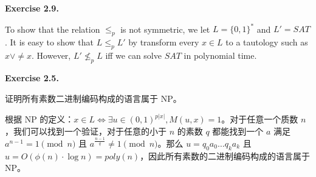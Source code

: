 \documentclass[a4paper]{article}
\newenvironment{exercise}[1]{
	\par
	\noindent\textbf{Exercise #1.}\quad
}{
	\par
	\bigskip
}
\begin{document}
	\begin{exercise}{2.9}
		To show that the relation $\leq_p$ is not symmetric, we let $L=\{0,1\}^*$ and $L'=SAT$. It is easy to show that $L\leq_p L'$ by transform every $x\in L$ to a tautology such as $x\vee \neq x$. However, $L'\not\leq_p L$ iff we can solve $SAT$ in polynomial time.
	\end{exercise}
	
	\begin{exercise}{2.5}
		证明所有素数二进制编码构成的语言属于 NP。​

		根据 NP 的定义：$x\in L \iff\exists u\in (0,1)^{p|x|},M(u,x)=1$。对于任意一个质数 $n$，我们可以找到一个验证，对于任意的小于 $n$ 的素数 $q$ 都能找到一个 $a$ 满足 $a^{n-1}=1 \pmod n$ 且 $a^{\frac{n-1}{q}}\ne 1 \pmod n$。那么 $u=q_0a_0\dots q_ka_k$ 且 $u=O(\phi (n)\cdot\log n)=poly (n)$，因此所有素数的二进制编码构成的语言属于 NP。
	\end{exercise}
\end{document}

